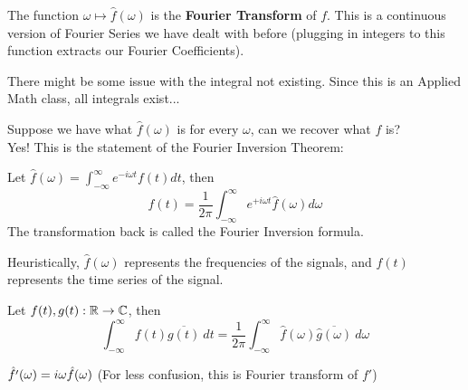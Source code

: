 \documentclass{article}
\begin{document}
\begin{definition}
    The function $\omega \mapsto \hat{f}(\omega)$ is the \textbf{Fourier Transform} of $f$. This is a continuous version of Fourier Series we have dealt with before (plugging in integers to this function extracts our Fourier Coefficients).
\end{definition}

\begin{remark}
    There might be some issue with the integral not existing. Since this is an Applied Math class, all integrals exist...
\end{remark}


Suppose we have what $\hat{f}(\omega)$ is for every $\omega$, can we recover what $f$ is?\\

Yes! This is the statement of the Fourier Inversion Theorem:

\begin{theorem}
    Let $\hat{f}(\omega) = \int_{-\infty}^\infty e^{-i\omega t} f(t) dt$, then
    \[f(t) = \frac{1}{2\pi} \int_{-\infty}^\infty e^{+i\omega t} \hat{f}(\omega) d\omega\]
    The transformation back is called the Fourier Inversion formula.
\end{theorem}

Heuristically, $\hat{f}(\omega)$ represents the frequencies of the signals, and $f(t)$ represents the time series of the signal.

\begin{proposition}
Let $f(t), g(t): \mathbb{R} \to \mathbb{C}$, then
\[\int_{-\infty}^\infty f(t) \overline{g(t)}\ dt = \frac{1}{2\pi} \int_{-\infty}^\infty \hat{f}(\omega) \overline{\hat{g}(\omega)}\ d\omega\]
\end{proposition}

\begin{proposition}
    $\Hat{f'}(\omega) = i \omega \hat{f}(\omega)$ (For less confusion, this is Fourier transform of $f'$)
\end{proposition}
\end{document}
